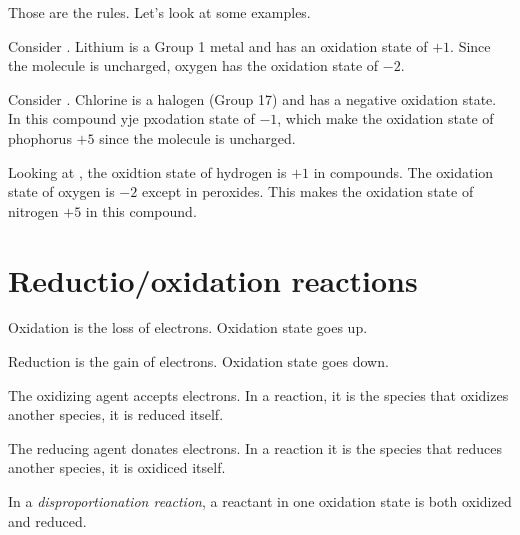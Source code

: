 \documentclass[../mit-general-chemistry.tex]{subfiles}
\begin{document}
Those are the rules. Let's look at some examples.


\begin{example}
  Consider . Lithium is a Group 1 metal and has an oxidation
  state of $+1$. Since the molecule is uncharged, oxygen has the
  oxidation state of $-2$.
\end{example}

\begin{example}
  Consider . Chlorine is a halogen (Group 17) and has a
  negative oxidation state. In this compound yje pxodation state of
  $-1$, which make the oxidation state of phophorus $+5$ since the
  molecule is uncharged.
\end{example}

\begin{example}
  Looking at , the oxidtion state of hydrogen is $+1$ in
  compounds. The oxidation state of oxygen is $-2$ except in
  peroxides. This makes the oxidation state of nitrogen $+5$ in this
  compound.
\end{example}





\section{Reductio/oxidation reactions}

\begin{definition}[Oxidation]
  Oxidation is the loss of electrons. Oxidation state goes up.
\end{definition}


\begin{definition}[Reduction]
  Reduction is the gain of electrons. Oxidation state goes down.
\end{definition}


\begin{definition}
  The oxidizing agent accepts electrons. In a reaction, it is the
  species that oxidizes another species, it is reduced itself.
\end{definition}


\begin{definition}
  The reducing agent donates electrons. In a reaction it is the
  species that reduces another species, it is oxidiced itself.
\end{definition}



In a {\em disproportionation reaction}, a reactant in one oxidation
state is both oxidized and reduced.
\end{document}
